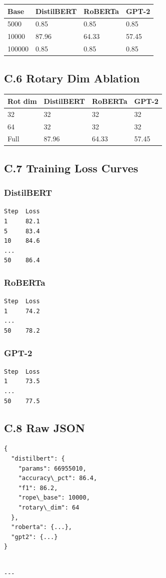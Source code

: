 \begin{table}[H]
\centering
\small
\begin{tabular}{llll}
\toprule
\textbf{Base} & \textbf{DistilBERT} & \textbf{RoBERTa} & \textbf{GPT-2} \\
\midrule
5000 & 0.85 & 0.85 & 0.85 \\
10000 & 87.96 & 64.33 & 57.45 \\
100000 & 0.85 & 0.85 & 0.85 \\
\bottomrule
\end{tabular}
\end{table}

\subsection{C.6 Rotary Dim Ablation}

\begin{table}[H]
\centering
\small
\begin{tabular}{llll}
\toprule
\textbf{Rot dim} & \textbf{DistilBERT} & \textbf{RoBERTa} & \textbf{GPT-2} \\
\midrule
32 & 32 & 32 & 32 \\
64 & 32 & 32 & 32 \\
Full & 87.96 & 64.33 & 57.45 \\
\bottomrule
\end{tabular}
\end{table}

\subsection{C.7 Training Loss Curves}

\subsubsection{DistilBERT}
\begin{lstlisting}
Step  Loss
1     82.1
5     83.4
10    84.6
...
50    86.4
\end{lstlisting}

\subsubsection{RoBERTa}
\begin{lstlisting}
Step  Loss
1     74.2
...
50    78.2
\end{lstlisting}

\subsubsection{GPT-2}
\begin{lstlisting}
Step  Loss
1     73.5
...
50    77.5
\end{lstlisting}

\subsection{C.8 Raw JSON}

\begin{lstlisting}
{
  "distilbert": {
    "params": 66955010,
    "accuracy\_pct": 86.4,
    "f1": 86.2,
    "rope\_base": 10000,
    "rotary\_dim": 64
  },
  "roberta": {...},
  "gpt2": {...}
}
\end{lstlisting}
\begin{lstlisting}

---
\end{lstlisting}